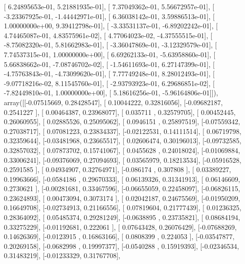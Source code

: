 \documentclass{article}
\begin{document}
       [  6.24895653e-01,   5.21881935e-01],
       [  7.37049362e-01,   5.56672957e-01],
       [ -3.23367925e-01,  -1.44442971e-01],
       [  6.36038142e-01,   3.59886513e-01],
       [  1.00000000e+00,   9.39412798e-01],
       [ -3.33531137e-01,  -6.89202242e-01],
       [  4.74465087e-01,   4.83575961e-02],
       [  4.77064023e-02,  -4.37555515e-01],
       [ -8.75082320e-01,   5.81662983e-01],
       [ -3.36047869e-01,  -3.12329579e-01],
       [  7.74537315e-01,   1.00000000e+00],
       [  6.69262133e-01,  -5.63958860e-01],
       [  5.66838662e-01,  -7.08746702e-02],
       [ -1.54611693e-01,   6.27147399e-01],
       [ -4.75763843e-01,  -4.73099620e-01],
       [  7.77749248e-01,   8.28012493e-01],
       [ -9.07718216e-02,   8.11545760e-01],
       [ -2.93793923e-01,   6.29686851e-02],
       [ -7.82449810e-01,   1.00000000e+00],
       [  5.18616256e-01,  -5.96164806e-01]]), array([[-0.07515669,  0.28428547],
       [ 0.10044222,  0.32816056],
       [-0.09682187,  0.2541227 ],
       [ 0.00464387,  0.23968077],
       [ 0.035711  ,  0.32579705],
       [ 0.00452445,  0.26060955],
       [ 0.02885526,  0.25095062],
       [ 0.0946151 ,  0.25897519],
       [-0.07559342,  0.27038717],
       [ 0.07081223,  0.23834337],
       [-0.02122531,  0.14111514],
       [ 0.06719798,  0.32359644],
       [-0.03481968,  0.23665517],
       [ 0.02606474,  0.30196013],
       [-0.09732585,  0.32857032],
       [ 0.07873702,  0.15741067],
       [ 0.0455628 ,  0.24018024],
       [-0.01069884,  0.33006241],
       [-0.09376069,  0.27094693],
       [ 0.03565979,  0.18213534],
       [-0.05916528,  0.2591585 ],
       [ 0.04934907,  0.32764971],
       [-0.086174  ,  0.307808  ],
       [ 0.03389227,  0.19963666],
       [-0.0584186 ,  0.29670333],
       [ 0.06139326,  0.31341913],
       [ 0.06146609,  0.2730621 ],
       [-0.00281681,  0.33467596],
       [-0.06655059,  0.22458097],
       [-0.06826115,  0.23624893],
       [ 0.00473094,  0.3073174 ],
       [ 0.02042187,  0.24675569],
       [-0.01950209,  0.16649708],
       [-0.02734913,  0.21166556],
       [ 0.07819604,  0.21777439],
       [ 0.01236325,  0.28364092],
       [ 0.05485374,  0.29281249],
       [-0.0638895 ,  0.23735821],
       [ 0.08684194,  0.33275229],
       [-0.01192681,  0.222061  ],
       [ 0.07643428,  0.26076429],
       [-0.07688269,  0.14626369],
       [-0.0123915 ,  0.16863166],
       [ 0.0808399 ,  0.224053  ],
       [-0.03547877,  0.20269158],
       [-0.0682998 ,  0.19997377],
       [-0.0540288 ,  0.15919393],
       [-0.02346534,  0.31483219],
       [-0.01233329,  0.31767708],
\end{document}
